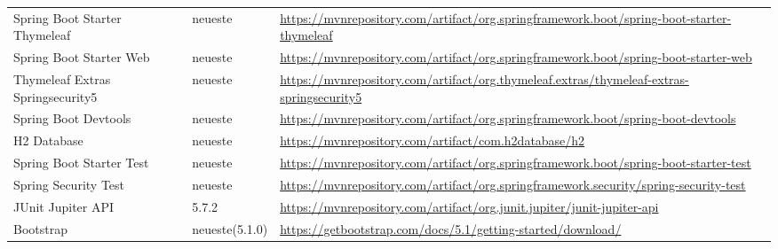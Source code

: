 {\begin{longtable}[h]{p{4cm} p{2cm} p{8cm}}
    Spring Boot Starter Thymeleaf    & neueste          & \url{https://mvnrepository.com/artifact/org.springframework.boot/spring-boot-starter-thymeleaf}  \\
    \rowcolor[HTML]{E7E7E7}
    Spring Boot Starter Web          & neueste          & \url{https://mvnrepository.com/artifact/org.springframework.boot/spring-boot-starter-web}        \\
    Thymeleaf Extras Springsecurity5 & neueste          & \url{https://mvnrepository.com/artifact/org.thymeleaf.extras/thymeleaf-extras-springsecurity5}   \\
    \rowcolor[HTML]{E7E7E7}
    Spring Boot Devtools             & neueste          & \url{https://mvnrepository.com/artifact/org.springframework.boot/spring-boot-devtools}           \\
    H2 Database                      & neueste          & \url{https://mvnrepository.com/artifact/com.h2database/h2}                                       \\
    \rowcolor[HTML]{E7E7E7}
    Spring Boot Starter Test         & neueste          & \url{https://mvnrepository.com/artifact/org.springframework.boot/spring-boot-starter-test}       \\
    Spring Security Test             & neueste          & \url{https://mvnrepository.com/artifact/org.springframework.security/spring-security-test}       \\
    \rowcolor[HTML]{E7E7E7}
    JUnit Jupiter API                & 5.7.2            & \url{https://mvnrepository.com/artifact/org.junit.jupiter/junit-jupiter-api}                     \\
    Bootstrap                        & neueste(5.1.0)   & \url{https://getbootstrap.com/docs/5.1/getting-started/download/}                                \\
\end{longtable}

}
